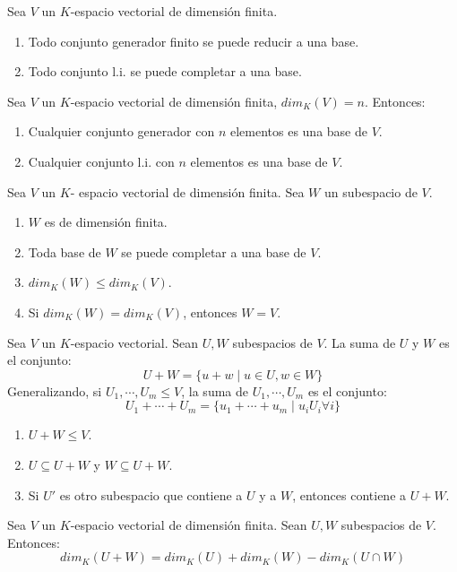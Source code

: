 \begin{theorem}
    Sea $V$ un $K$-espacio vectorial de dimensión finita. 
    \begin{enumerate}[label=\alph*)]
        \item Todo conjunto generador finito se puede reducir a una base.
        \item Todo conjunto l.i. se puede completar a una base.
    \end{enumerate}
\end{theorem}
\begin{corollary}{}{}
    Sea $V$ un $K$-espacio vectorial de dimensión finita, $dim_K(V) = n$. Entonces:
    \begin{enumerate}[label=\alph*)]
        \item Cualquier conjunto generador con $n$ elementos es una base de $V$.
        \item Cualquier conjunto l.i. con $n$ elementos es una base de $V$.
    \end{enumerate}
\end{corollary}
\begin{theorem}
    Sea $V$ un $K$- espacio vectorial de dimensión finita. Sea $W$ un subespacio de $V$.
    \begin{enumerate}
        \item $W$ es de dimensión finita.
        \item Toda base de $W$ se puede completar a una base de $V$.
        \item $dim_K(W) \leq dim_K(V)$.
        \item Si $dim_K(W) = dim_K(V)$, entonces $W = V$.
    \end{enumerate}
\end{theorem}

\begin{definition}{}{}
    Sea $V$ un $K$-espacio vectorial. Sean $U, W$ subespacios de $V$. La suma de $U$ y $W$ es el conjunto:
    $$U+W = \{u+w \mid u \in U, w \in W\}$$
    Generalizando, si $U_1, \cdots, U_m \leq V$, la suma de $U_1, \cdots, U_m$ es el conjunto:
    $$U_1 + \cdots + U_m = \{u_1 + \cdots + u_m \mid u_i U_i \forall i \}$$
\end{definition}
\begin{obs}{}{}
    \begin{enumerate}
        \item $U+W \leq V$.
        \item $U \subseteq U+W$ y $W \subseteq U+W$.
        \item Si $U'$ es otro subespacio que contiene a $U$ y a $W$, entonces contiene a $U+W$.
    \end{enumerate}
\end{obs}
\begin{theorem}
    Sea $V$ un $K$-espacio vectorial de dimensión finita. Sean $U,W$ subespacios de $V$. Entonces:
    $$dim_K(U+W) = dim_K(U) + dim_K(W) - dim_K(U \cap W)$$
\end{theorem}

